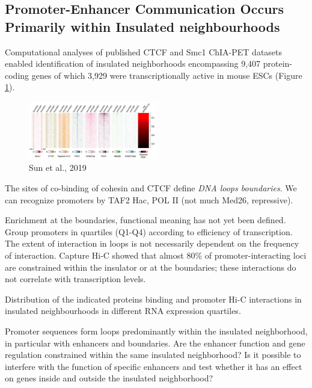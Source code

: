 \hypertarget{promoter-enhancer-communication-occurs-primarily-within-insulated-neighbourhoods}{%
\subsection{Promoter-Enhancer Communication Occurs Primarily within Insulated neighbourhoods}\label{promoter-enhancer-communication-occurs-primarily-within-insulated-neighbourhoods}}

Computational analyses of published CTCF and Smc1 ChIA-PET datasets enabled identification of insulated neighborhoods encompassing 9,407 protein-coding genes of which 3,929 were transcriptionally active in mouse ESCs (Figure \ref{fig:mouse}).

\begin{figure}
\centering
\includegraphics[width=0.5\textwidth]{../_resources/Screenshot_2022-10-19_at_10-01-09.png}
\caption{Sun et al., 2019}
\label{fig:mouse}
\end{figure}

The sites of co-binding of cohesin and CTCF define \emph{DNA loops boundaries}. We can recognize promoters by TAF2 Hac, POL II (not much Med26, repressive).

Enrichment at the boundaries, functional meaning has not yet been defined. Group promoters in quartiles (Q1-Q4) according to efficiency of transcription. The extent of interaction in loops is not necessarily dependent on the frequency of interaction. Capture Hi-C showed that almost 80\% of promoter-interacting loci are constrained within the insulator or at the boundaries; these interactions do not correlate with transcription levels.

Distribution of the indicated proteins binding and promoter Hi-C interactions in insulated neighbourhoods in different RNA expression quartiles.

Promoter sequences form loops predominantly within the insulated neighborhood, in particular with enhancers and boundaries. Are the enhancer function and gene regulation constrained within the same insulated neighborhood? Is it possible to interfere with the function of specific enhancers and test whether it has an effect on genes inside and outside the insulated neighborhood?


